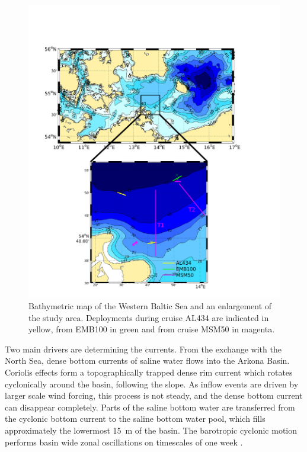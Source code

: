  \begin{figure}[ht]
 \centering
\includegraphics[width=18cm]{bilder/studyarea.pdf}
 \caption{Bathymetric map of the Western Baltic Sea and an enlargement of the 
study area. Deployments during cruise AL434 are indicated in yellow, from 
EMB100 in green and from cruise MSM50 in magenta.}
 \label{studyarea}
 \end{figure}

Two main drivers are determining the currents. From the exchange with the North 
Sea, dense bottom currents of saline water flows into the Arkona Basin. 
Coriolis effects form a topographically trapped dense rim current which rotates 
cyclonically around the basin, following the slope. As inflow events are 
driven by larger scale wind forcing, this process is not steady, and the 
dense bottom current can disappear completely. Parts of the saline bottom water 
are transferred from the cyclonic bottom current to the saline bottom water 
pool, which fills approximately the lowermost 15~m of the basin. The barotropic 
cyclonic motion performs basin wide zonal oscillations on timescales of one 
week \citep[][]{lass2003}.

